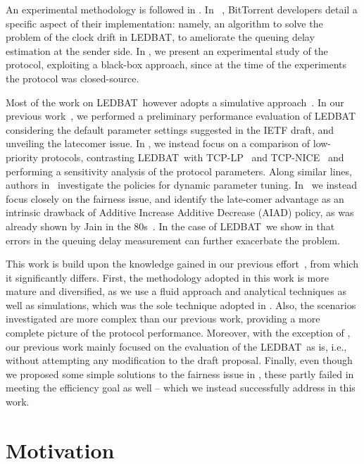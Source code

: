 \documentclass[conference]{IEEEtran}
\newcommand{\btledbat}[0]{LEDBAT}
\begin{document}
An experimental methodology is followed in \cite{cohen10iptps,pam10}.
In ~\cite{cohen10iptps}, BitTorrent developers detail a specific aspect of their
implementation: namely, an algorithm to solve the problem of the clock drift in \btledbat, to ameliorate the queuing delay estimation at the sender side.
In \cite{pam10}, we present an experimental study of the protocol, exploiting a black-box approach, since at the time of the experiments the protocol was closed-source.

Most of the work on \btledbat\ however adopts a simulative approach~\cite{icccn10,globecom10,lcn10,gordon2010iccnt}. In our previous work~\cite{icccn10}, we performed a preliminary performance evaluation of \btledbat\, considering the default parameter settings suggested in the IETF draft, and unveiling the latecomer issue. In \cite{lcn10}, we instead focus on a comparison of low-priority protocols, contrasting \btledbat\ with TCP-LP~\cite{tcp_lp} and TCP-NICE~\cite{tcp_nice} and performing a sensitivity analysis of the protocol parameters. Along similar lines, authors in~\cite{gordon2010iccnt} investigate the policies for dynamic parameter tuning.
In~\cite{globecom10} we instead focus closely on the fairness issue, and  identify the late-comer advantage as an intrinsic drawback of Additive Increase Additive Decrease (AIAD) policy, as was already shown by Jain in the 80s~\cite{Jain80}. In the case of \btledbat\, we show in \cite{globecom10} that errors in the queuing delay measurement can further exacerbate the problem.

This work is build upon the knowledge gained in our previous effort~\cite{icccn10,globecom10,lcn10}, from which it significantly differs. First, the methodology adopted in this work is more mature and diversified, as we use a fluid approach and analytical techniques as well as simulations, which was the sole technique adopted in \cite{icccn10,globecom10,lcn10}. Also, the scenarios investigated are more complex than our previous work, providing a more complete picture of the protocol performance. Moreover, with the exception of \cite{globecom10}, our previous work mainly focused on the evaluation of the \btledbat\ as is, i.e., without attempting any modification to the draft proposal. Finally, even though we proposed some simple solutions to the fairness issue in \cite{globecom10}, these partly failed in meeting the efficiency goal as well -- which we instead successfully address in this work.



\section{Motivation}\label{sec:motivation}
\end{document}
